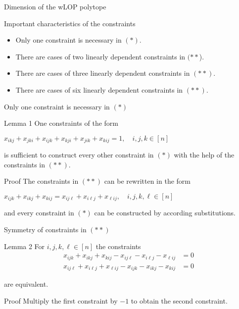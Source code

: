 \documentclass[xcolor=dvipsnames]{beamer}
\numberwithin{bsp}{section}
\numberwithin{figure}{section}
\begin{document}
\begin{frame}{Dimension of the wLOP polytope}
	\begin{block}{Important characteristics of the constraints}
		\begin{itemize}
			\item Only one constraint is necessary in $(*)$.
			\item There are cases of two linearly dependent constraints in $(**$).
			\item There are cases of three linearly dependent constraints in $(**)$.
			\item There are cases of six linearly dependent constraints in $(**)$.
		\end{itemize}
	\end{block}
\end{frame}

\begin{frame}{Only one constraint is necessary in $(*)$}
	\begin{block}{Lemma 1}
		One constraints of the form 
		
		\begin{center}
			$x_{ikj} + x_{jki} + x_{ijk} + x_{kji} + x_{jik} + x_{kij} = 1, \quad i, j, k \in [n]$
		\end{center} 
		
		is sufficient to construct every other constraint in $(*)$ with the help of the constraints in $(**)$.
	\end{block}
	
	\begin{block}{Proof}
		The constraints in $(**)$ can be rewritten in the form 

		\begin{center}
			$x_{ijk} + x_{ikj} + x_{kij} =  x_{ij\ell} + x_{i\ell j} + x_{\ell ij}, \quad i, j, k, \ell \in [n]$
		\end{center}
		
		and every constraint in $(*)$ can be constructed by according substitutions.
	\end{block}
\end{frame}

\begin{frame}{Symmetry of constraints in $(**)$}
	\begin{block}{Lemma 2}
		For $i,j,k,\ell \in [n]$ the constraints
		\begin{align*}
		x_{ijk} + x_{ikj} + x_{kij} - x_{ij\ell} - x_{i\ell j} - x_{\ell ij} &= 0 \\
		x_{ij\ell} + x_{i\ell j} + x_{\ell ij} - x_{ijk} - x_{ikj} - x_{kij} &= 0
		\end{align*} 
		
		are equivalent.
	\end{block}
	
	\begin{block}{Proof}
		Multiply the first constraint by $-1$ to obtain the second constraint.
	\end{block}
\end{frame}
\end{document}
